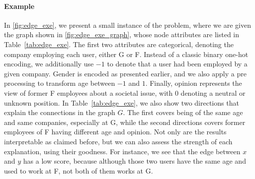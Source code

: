 \paragraph{Example}

In \autoref{fig:edge_exe}, we present a small instance of the \ecp{} problem, where we are given the
graph shown in \autoref{fig:edge_exe_graph}, whose node attributes are listed
in Table~\ref{tab:edge_exe}. The first two attributes are categorical, denoting the company employing
each user, either \textsf{G} or \textsf{F}. Instead of a classic binary one-hot encoding, we
additionally use $-1$ to denote that a user had been employed by a given company. \textsf{Gender} is
encoded as presented earlier, and we also apply a pre processing to transform \textsf{age} between
$-1$ and $1$. Finally, \textsf{opinion} represents the view of former \textsf{F} employees about a
societal issue, with $0$ denoting a neutral or unknown position. In Table~\ref{tab:edge_exe}, we also show two
directions that explain the connections in the graph $G$. The first covers being of the same age and
same companies, especially at \textsf{G}, while the second directions covers former employees of
\textsf{F} having different \textsf{age} and \textsf{opinion}. Not only are the results
interpretable as claimed before, but we can also assess the strength of each explanation, using
their goodness. For instance, we see that the edge between $x$ and $y$ has a low score, because
although those two users have the same \textsf{age} and used to work at \textsf{F}, not both of them
works at \textsf{G}.

